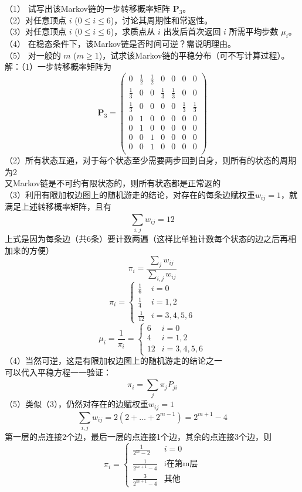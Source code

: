 \documentclass[UTF8]{ctexart}
\begin{document}
\noindent （1） 试写出该Markov链的一步转移概率矩阵 \( \bm{P}_3 \)。\\
（2）对任意顶点 \( i \) (\( 0 \leq i \leq 6 \))，讨论其周期性和常返性。\\
（3）对任意顶点 \( i \) (\( 0 \leq i \leq 6 \))，求质点从 \( i \) 出发后首次返回 \( i \) 所需平均步数 \( \mu_i \)。\\
（4） 在稳态条件下，该Markov链是否时间可逆？需说明理由。\\
（5） 对一般的 \( m \) (\( m \geq 1 \))，试求该Markov链的平稳分布（可不写计算过程）。\\
解：（1）一步转移概率矩阵为
\[
\bm{P}_3=
\begin{pmatrix}
	0 & \frac{1}{2} &\frac{1}{2} & 0 &0 &0&0\\
	\frac{1}{3} & 0&0 & \frac{1}{3} &\frac{1}{3} &0&0\\
	\frac{1}{3} & 0&0 & 0 &0 &\frac{1}{3}&\frac{1}{3}\\
	0 & 1 &0 & 0 &0 &0&0\\
	0 & 1 &0 & 0 &0 &0&0\\
	0 & 0&1 & 0 &0 &0&0\\
	0 & 0&1 & 0 &0 &0&0\\
\end{pmatrix}
\]
（2）所有状态互通，对于每个状态至少需要两步回到自身，则所有的状态的周期为2\\
又Markov链是不可约有限状态的，则所有状态都是正常返的\\
（3）利用有限加权边图上的随机游走的结论，对存在的每条边赋权重$w_{ij}=1$，就满足上述转移概率矩阵，且有\\
\[
\sum\limits_{i,j}^{} w_{ij}=12
\]
上式是因为每条边（共6条）要计数两遍（这样比单独计数每个状态的边之后再相加来的方便）\\
\[
\pi_i=\frac{\sum\limits_{j}^{} w_{ij}}{\sum\limits_{i,j}^{} w_{ij}}
\]
\[
\pi_i=
\begin{cases}
	\frac{1}{6}  &  i=0 \\
	\frac{1}{4} &  i=1,2\\
	\frac{1}{12} & i=3,4,5,6
\end{cases}
\]
\[
\mu_i=\frac{1}{\pi_i}=
\begin{cases}
	6  &  i=0 \\
4 &  i=1,2\\
12 & i=3,4,5,6
\end{cases}
\]
（4）当然可逆，这是有限加权边图上的随机游走的结论之一\\
可以代入平稳方程一一验证：\\
\[
\pi_i=\sum\limits_{j}^{} \pi_j P_{ji}
\]
（5）类似（3），仍然对存在的边赋权重$w_{ij}=1$\\
\[
\sum\limits_{i,j}^{} w_{ij}=2(2+\dots+2^{m-1})=2^{m+1}-4
\]
第一层的点连接2个边，最后一层的点连接1个边，其余的点连接3个边，则\\
\[
\pi_i=
\begin{cases}
	\frac{1}{2^m-2}  &  i=0 \\
	\frac{1}{2^{m+1}-4} &  \text{i在第m层}\\
	\frac{3}{2^{m+1}-4} & \text{其他}
\end{cases}
\]\\
\end{document}
